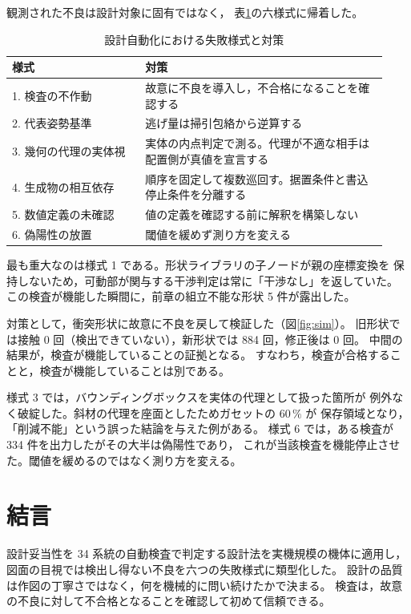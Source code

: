 \documentclass[a4paper,9pt,twocolumn]{ltjsarticle}
\begin{document}
観測された不良は設計対象に固有ではなく，
表\ref{tab:modes}の六様式に帰着した。

\begin{table}[t]
\centering\footnotesize
\caption{設計自動化における失敗様式と対策}
\label{tab:modes}
\begin{tabular}{@{}p{0.33\linewidth}p{0.60\linewidth}@{}}
\toprule
様式 & 対策\\
\midrule
1. 検査の不作動 & 故意に不良を導入し，不合格になることを確認する\\
2. 代表姿勢基準 & 逃げ量は掃引包絡から逆算する\\
3. 幾何の代理の実体視 & 実体の内点判定で測る。代理が不適な相手は配置側が真値を宣言する\\
4. 生成物の相互依存 & 順序を固定して複数巡回す。据置条件と書込停止条件を分離する\\
5. 数値定義の未確認 & 値の定義を確認する前に解釈を構築しない\\
6. 偽陽性の放置 & 閾値を緩めず測り方を変える\\
\bottomrule
\end{tabular}
\end{table}

最も重大なのは様式 1 である。形状ライブラリの子ノードが親の座標変換を
保持しないため，可動部が関与する干渉判定は常に「干渉なし」を返していた。
この検査が機能した瞬間に，前章の組立不能な形状 5 件が露出した。

対策として，衝突形状に故意に不良を戻して検証した（図\ref{fig:sim}）。
旧形状では接触 0 回（検出できていない），新形状では 884 回，修正後は 0 回。
中間の結果が，検査が機能していることの証拠となる。
すなわち，検査が合格することと，検査が機能していることは別である。

様式 3 では，バウンディングボックスを実体の代理として扱った箇所が
例外なく破綻した。斜材の代理を座面としたためガセットの $60\,\%$ が
保存領域となり，「削減不能」という誤った結論を与えた例がある。
様式 6 では，ある検査が 334 件を出力したがその大半は偽陽性であり，
これが当該検査を機能停止させた。閾値を緩めるのではなく測り方を変える。

\section{結言}

設計妥当性を 34 系統の自動検査で判定する設計法を実機規模の機体に適用し，
図面の目視では検出し得ない不良を六つの失敗様式に類型化した。
設計の品質は作図の丁寧さではなく，何を機械的に問い続けたかで決まる。
検査は，故意の不良に対して不合格となることを確認して初めて信頼できる。
\end{document}
